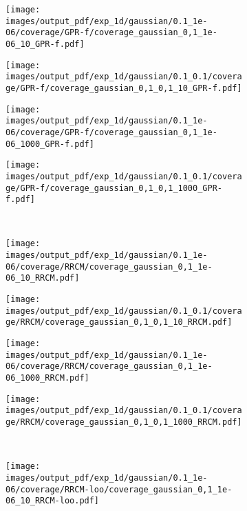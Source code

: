 \documentclass[a4paper,14pt]{extarticle}
\begin{document}
\begin{figure}%
  \centering
  \begin{subfigure}[b]{0.25\linewidth}
    \texttt{[image: images/output\_pdf/exp\_1d/gaussian/0.1\_1e-06/coverage/GPR-f/coverage\_gaussian\_0,1\_1e-06\_10\_GPR-f.pdf]}
  \end{subfigure}%
  \begin{subfigure}[b]{0.25\linewidth}
    \texttt{[image: images/output\_pdf/exp\_1d/gaussian/0.1\_0.1/coverage/GPR-f/coverage\_gaussian\_0,1\_0,1\_10\_GPR-f.pdf]}
  \end{subfigure}%
  \begin{subfigure}[b]{0.25\linewidth}
    \texttt{[image: images/output\_pdf/exp\_1d/gaussian/0.1\_1e-06/coverage/GPR-f/coverage\_gaussian\_0,1\_1e-06\_1000\_GPR-f.pdf]}
  \end{subfigure}%
  \begin{subfigure}[b]{0.25\linewidth}
    \texttt{[image: images/output\_pdf/exp\_1d/gaussian/0.1\_0.1/coverage/GPR-f/coverage\_gaussian\_0,1\_0,1\_1000\_GPR-f.pdf]}
  \end{subfigure}\\
  \begin{subfigure}[b]{0.25\linewidth}
    \texttt{[image: images/output\_pdf/exp\_1d/gaussian/0.1\_1e-06/coverage/RRCM/coverage\_gaussian\_0,1\_1e-06\_10\_RRCM.pdf]}
  \end{subfigure}%
  \begin{subfigure}[b]{0.25\linewidth}
    \texttt{[image: images/output\_pdf/exp\_1d/gaussian/0.1\_0.1/coverage/RRCM/coverage\_gaussian\_0,1\_0,1\_10\_RRCM.pdf]}
  \end{subfigure}%
  \begin{subfigure}[b]{0.25\linewidth}
    \texttt{[image: images/output\_pdf/exp\_1d/gaussian/0.1\_1e-06/coverage/RRCM/coverage\_gaussian\_0,1\_1e-06\_1000\_RRCM.pdf]}
  \end{subfigure}%
  \begin{subfigure}[b]{0.25\linewidth}
    \texttt{[image: images/output\_pdf/exp\_1d/gaussian/0.1\_0.1/coverage/RRCM/coverage\_gaussian\_0,1\_0,1\_1000\_RRCM.pdf]}
  \end{subfigure}\\
  \begin{subfigure}[b]{0.25\linewidth}
    \texttt{[image: images/output\_pdf/exp\_1d/gaussian/0.1\_1e-06/coverage/RRCM-loo/coverage\_gaussian\_0,1\_1e-06\_10\_RRCM-loo.pdf]}

\end{subfigure}
\end{figure}
\end{document}
